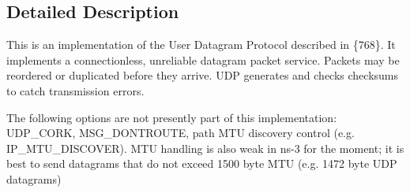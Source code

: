 \subsection{Detailed Description}
This is an implementation of the User Datagram Protocol described in \{768\}. It implements a connectionless, unreliable datagram packet service. Packets may be reordered or duplicated before they arrive. U\+DP generates and checks checksums to catch transmission errors.

The following options are not presently part of this implementation\+: U\+D\+P\+\_\+\+C\+O\+RK, M\+S\+G\+\_\+\+D\+O\+N\+T\+R\+O\+U\+TE, path M\+TU discovery control (e.\+g. I\+P\+\_\+\+M\+T\+U\+\_\+\+D\+I\+S\+C\+O\+V\+ER). M\+TU handling is also weak in ns-\/3 for the moment; it is best to send datagrams that do not exceed 1500 byte M\+TU (e.\+g. 1472 byte U\+DP datagrams) 